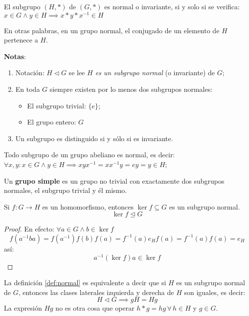 	\begin{fmd-definition} \label{def:normal}
		El subgrupo $(H, *)$ de $(G, *)$ es normal o invariante, si y solo si se verifica: $ x \in G \land y \in H \implies x * y * x^{-1} \in H $
	\end{fmd-definition}
	
	En otras palabras, en un grupo normal, el conjugado de un elemento de $H$ pertenece a $H$.
	
	\textbf{Notas}:
	\begin{enumerate}
		\item Notación: $H \triangleleft G$ se lee \textit{$H$ es un subgrupo normal} (o invariante) de $G$;
		\item En toda $G$ siempre existen por lo menos dos subgrupos normales:
		\begin{itemize}
			\item El subgrupo trivial: $\{e\}$;
			\item El grupo entero: $G$
		\end{itemize}
		\item Un subgrupo es distinguido si y sólo si es invariante.
	\end{enumerate}
	
	\begin{proposition} \label{prop:subgrupo}
		Todo subgrupo de un grupo abeliano es normal, es decir: $\forall x, y: x\in G \land y \in H \implies xyx^{-1} = xx^{-1}y = ey = y \in H$;
	\end{proposition}
	
	\begin{definition}
		Un \textbf{grupo simple} es un grupo no trivial con exactamente dos subgrupos normales, el subgrupo trivial y él mismo.
	\end{definition}
	
	\begin{proposition}
		Si $f: G \rightarrow H$ es un homomorfismo, entonces $\ker f \subseteq G$ es un subgrupo normal. \[ \ker f \trianglelefteq G \]
	\end{proposition}
	
	\begin{proof}
		En efecto: $\forall a \in G \land b \in \ker f$
		\[f(a^{-1}ba) = f(a^{-1}) f(b) f(a) = f^{-1}(a) e_H f(a) = f^{-1}(a)f(a) = e_H\]
		así:
		\[a^{-1} (\ker f) a \in \ker f\]
	\end{proof}
	
	La definición \ref{def:normal} es equivalente a decir que si  $H$ es un subgrupo normal de $G$, entonces las clases laterales izquierda y derecha de $H$ son iguales, es decir:
	\begin{equation} \label{eq:normal}
		H \triangleleft G \implies gH = Hg
	\end{equation}
	La expresión $Hg$ no es otra cosa que operar $h * g = hg \, \forall \, h \in H$ y $g \in G$.
	
